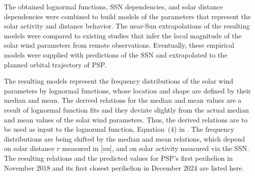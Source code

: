 The obtained lognormal functions, SSN dependencies, and solar distance dependencies were combined to build models of the parameters that represent the solar activity and distance behavior. The near-Sun extrapolations of the resulting models were compared to existing studies that infer the local magnitude of the solar wind parameters from remote observations. Eventually, these empirical models were supplied with predictions of the SSN and extrapolated to the planned orbital trajectory of PSP.

\medskip

The resulting models represent the frequency distributions of the solar wind parameters by lognormal functions, whose location and shape are defined by their median and mean.
The derived relations for the median and mean values are a result of lognormal function fits and they deviate slightly from the actual median and mean values of the solar wind parameters. Thus, the derived relations are to be used as input to the lognormal function, Equation~(4) in \citet{Venzmer2018}.
The frequency distributions are being shifted by the median and mean relations, which depend on solar distance $r$ measured in [au], and on solar activity measured via the SSN. The resulting relations and the predicted values for PSP's first perihelion in November 2018 and its first closest perihelion in December 2024 are listed here.
